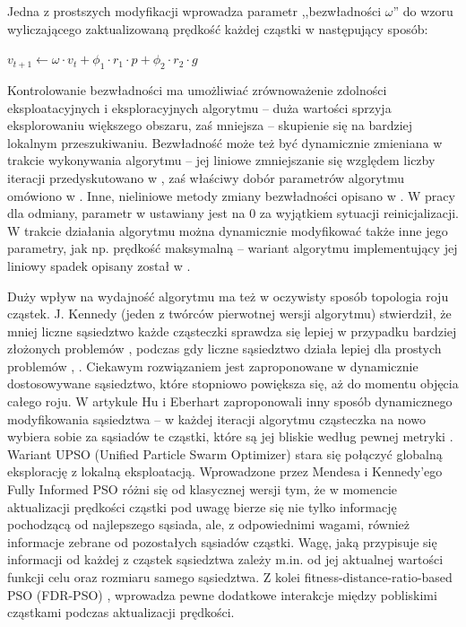 \documentclass[12pt, twoside, openany, abstract=on]{report}
\theoremstyle{definition}
\begin{document}
Jedna z prostszych modyfikacji 
wprowadza parametr ,,bezwładności $\omega$'' do wzoru wyliczającego zaktualizowaną prędkość każdej cząstki w następujący sposób:

\begin{center}

$v_{t+1} \leftarrow \omega \cdot v_t + \phi_1 \cdot r_1 \cdot p + \phi_2 \cdot r_2 \cdot g$

\end{center}

Kontrolowanie bezwładności ma umożliwiać zrównoważenie zdolności eksploatacyjnych i eksploracyjnych algorytmu 
 – duża wartości sprzyja eksplorowaniu większego obszaru, zaś mniejsza – skupienie się na bardziej lokalnym przeszukiwaniu. Bezwładność może też być dynamicznie zmieniana w trakcie wykonywania algorytmu – jej liniowe zmniejszanie się względem liczby iteracji przedyskutowano w \cite{ModPsoInertia}, zaś właściwy dobór parametrów algorytmu omówiono w \cite{ParamSelPso}. Inne, nieliniowe metody zmiany bezwładności opisano w \cite{PsoFuzzyInertia}. W pracy \cite{SelfOrgHPso} dla odmiany, parametr w ustawiany jest na 0 za wyjątkiem sytuacji reinicjalizacji.
W trakcie działania algorytmu można dynamicznie modyfikować także inne jego parametry, jak np. prędkość maksymalną – wariant algorytmu implementujący jej liniowy spadek opisany został w \cite{VmaxPso}.

Duży wpływ na wydajność algorytmu ma też w oczywisty sposób topologia 
roju cząstek. J. Kennedy (jeden z twórców pierwotnej wersji algorytmu) stwierdził, że mniej liczne sąsiedztwo każde cząsteczki sprawdza się lepiej w przypadku bardziej złożonych problemów%
, podczas gdy liczne sąsiedztwo działa lepiej dla prostych problemów \cite{TopologyPso}, \cite{PopStructPso}. Ciekawym rozwiązaniem jest zaproponowane w \cite{PsoNeighOp} dynamicznie dostosowywane sąsiedztwo, które stopniowo powiększa się, aż do momentu objęcia całego roju. W artykule \cite{MultiobjDynNeighPso} Hu i Eberhart zaproponowali inny sposób dynamicznego modyfikowania sąsiedztwa – w każdej iteracji algorytmu cząsteczka na nowo wybiera sobie za sąsiadów te cząstki, które są jej bliskie według pewnej metryki%
. Wariant UPSO (Unified Particle Swarm Optimizer) \cite{UPso} stara się połączyć globalną eksplorację z lokalną eksploatacją.
Wprowadzone przez Mendesa i Kennedy’ego \cite{FullyInformedPso} Fully Informed PSO różni się od klasycznej wersji tym, że w momencie aktualizacji prędkości cząstki pod uwagę bierze się nie tylko informację pochodzącą od najlepszego sąsiada, ale, z odpowiednimi wagami, również  informacje zebrane od pozostałych sąsiadów cząstki. Wagę, jaką przypisuje się informacji od każdej z cząstek sąsiedztwa zależy m.in. od jej aktualnej wartości funkcji celu oraz rozmiaru samego sąsiedztwa. 
 Z kolei fitness-distance-ratio-based PSO (FDR-PSO) \cite{FitnessDistRatio}, wprowadza pewne dodatkowe interakcje 
między pobliskimi cząstkami podczas aktualizacji prędkości.
\end{document}
